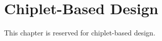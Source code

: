 \chapter{Chiplet-Based Design}
\label{chap:chiplets}

This chapter is reserved for chiplet-based design.

